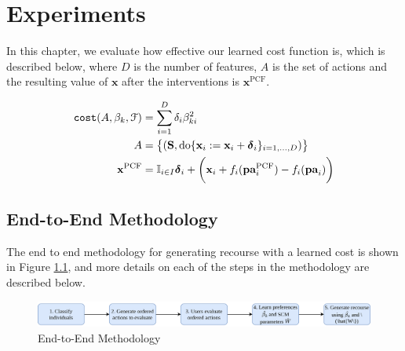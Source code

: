 \chapter{Experiments} \label{chapter:experiments}

In this chapter, we evaluate how effective our learned cost function is, which is described below, where $D$ is the number of features, $A$ is the set of actions and the resulting value of $\mathbf{x}$ after the interventions is $\mathbf{x}^{\text{PCF}}$.

\begin{align} \label{eq:cost_function_experiments}
	\operatorname*{\texttt{cost}}(A, \beta_k, \mathcal{F}) & = \sum_{i=1}^D \delta_i \beta_{ki}^2 \\ \nonumber
	A & = \big\{(\mathbf{S}, \text{do} \{\mathbf{x}_i:=\mathbf{x}_i + \boldsymbol{\delta}_i\}_{i=1, \ldots, D})\big\} \\ \nonumber
	\mathbf{x}^{\text{PCF}} & = \mathbb{I}_{i \in I} \boldsymbol{\delta}_i + \bigg( \mathbf{x}_i + f_i(\textbf{pa}^{\text{PCF}}_i) - f_i(\textbf{pa}_i) \bigg)
\end{align}

\section{End-to-End Methodology}

The end to end methodology for generating recourse with a learned cost is shown in Figure \ref{fig:workflow}, and more details on each of the steps in the methodology are described below.

\begin{figure}[!htb]
	\centering
	\includegraphics[width=\linewidth]{images/draw.io/workflow.png}
	\caption{End-to-End Methodology}
	\label{fig:workflow}
\end{figure}

